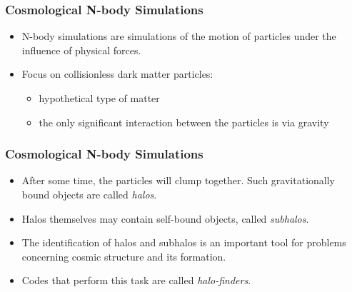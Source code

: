 

\begin{frame}
	\frametitle{Cosmological N-body Simulations}
	
	\begin{itemize}
		\item N-body simulations are simulations of the motion of particles under the influence of physical forces.
		\item Focus on collisionless dark matter particles: 
		
		\begin{itemize}
			\item   hypothetical type of matter 
			\item 	the only significant interaction between the particles is via gravity
		\end{itemize}
	
	\end{itemize}
	
\end{frame}








\begin{frame}
	\frametitle{Cosmological N-body Simulations}
	
	\begin{itemize}
		\item After some time, the particles will clump together. Such gravitationally bound objects are called \emph{halos}.
		\item Halos themselves may contain self-bound objects, called \emph{subhalos}.
		\item The identification of halos and subhalos is an important tool for problems concerning cosmic structure and its formation.
		\item Codes that perform this task are called \emph{halo-finders}.
	\end{itemize}
	
\end{frame}














